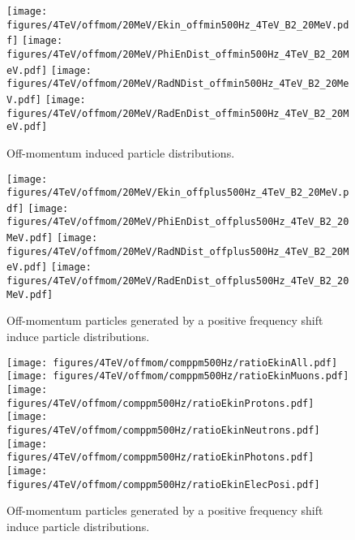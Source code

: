 \begin{figure}
\begin{center}
  \texttt{[image: figures/4TeV/offmom/20MeV/Ekin\_offmin500Hz\_4TeV\_B2\_20MeV.pdf]}
  \texttt{[image: figures/4TeV/offmom/20MeV/PhiEnDist\_offmin500Hz\_4TeV\_B2\_20MeV.pdf]}
  \texttt{[image: figures/4TeV/offmom/20MeV/RadNDist\_offmin500Hz\_4TeV\_B2\_20MeV.pdf]}
  \texttt{[image: figures/4TeV/offmom/20MeV/RadEnDist\_offmin500Hz\_4TeV\_B2\_20MeV.pdf]}
\end{center}
\vspace{-0.6cm}
 \caption{Off-momentum induced particle distributions.
  \label{offmom4TeV}}
\end{figure}

\begin{figure}%
\begin{center}
  \texttt{[image: figures/4TeV/offmom/20MeV/Ekin\_offplus500Hz\_4TeV\_B2\_20MeV.pdf]}
  \texttt{[image: figures/4TeV/offmom/20MeV/PhiEnDist\_offplus500Hz\_4TeV\_B2\_20MeV.pdf]}
  \texttt{[image: figures/4TeV/offmom/20MeV/RadNDist\_offplus500Hz\_4TeV\_B2\_20MeV.pdf]}
  \texttt{[image: figures/4TeV/offmom/20MeV/RadEnDist\_offplus500Hz\_4TeV\_B2\_20MeV.pdf]}
\end{center}
\vspace{-0.6cm}
 \caption{Off-momentum particles generated by a positive frequency shift induce particle distributions.
  \label{offmom4TeV}}
\end{figure}


\begin{figure}%
\begin{center}
  \texttt{[image: figures/4TeV/offmom/comppm500Hz/ratioEkinAll.pdf]}
  \texttt{[image: figures/4TeV/offmom/comppm500Hz/ratioEkinMuons.pdf]}
  \texttt{[image: figures/4TeV/offmom/comppm500Hz/ratioEkinProtons.pdf]}
  \texttt{[image: figures/4TeV/offmom/comppm500Hz/ratioEkinNeutrons.pdf]}
  \texttt{[image: figures/4TeV/offmom/comppm500Hz/ratioEkinPhotons.pdf]}
  \texttt{[image: figures/4TeV/offmom/comppm500Hz/ratioEkinElecPosi.pdf]}
\end{center}
\vspace{-0.6cm}
 \caption{Off-momentum particles generated by a positive frequency shift induce particle distributions.
  \label{compPM_ekin}}
\end{figure}

